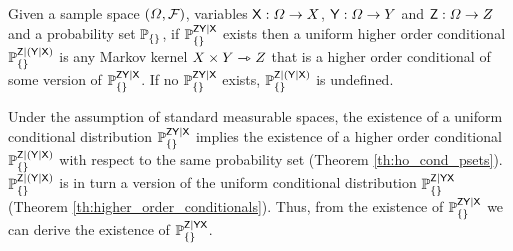 \begin{definition}\label{def:ho_cprob_pset}
Given a sample space $(\Omega,\mathcal{F})$, variables $\mathsf{X}:\Omega\to X$, $\mathsf{Y}:\Omega\to Y$ and $\mathsf{Z}:\Omega\to Z$ and a probability set $\mathbb{P}_{\{\}}$, if $\mathbb{P}_{\{\}}^{\mathsf{ZY}|\mathsf{X}}$ exists then a uniform higher order conditional $\mathbb{P}_{\{\}}^{\mathsf{Z}|(\mathsf{Y}|\mathsf{X})}$ is any Markov kernel $X\times Y\rightarrowtriangle Z$ that is a higher order conditional of some version of $\mathbb{P}_{\{\}}^{\mathsf{ZY}|\mathsf{X}}$. If no $\mathbb{P}_{\{\}}^{\mathsf{ZY}|\mathsf{X}}$ exists, $\mathbb{P}_{\{\}}^{\mathsf{Z}|(\mathsf{Y}|\mathsf{X})}$ is undefined.
\end{definition}

Under the assumption of standard measurable spaces, the existence of a uniform conditional distribution $\mathbb{P}_{\{\}}^{\mathsf{ZY}|\mathsf{X}}$ implies the existence of a higher order conditional $\mathbb{P}_{\{\}}^{\mathsf{Z}|(\mathsf{Y}|\mathsf{X})}$ with respect to the same probability set (Theorem \ref{th:ho_cond_psets}). $\mathbb{P}_{\{\}}^{\mathsf{Z}|(\mathsf{Y}|\mathsf{X})}$ is in turn a version of the uniform conditional distribution $\mathbb{P}_{\{\}}^{\mathsf{Z}|\mathsf{YX}}$ (Theorem \ref{th:higher_order_conditionals}). Thus, from the existence of $\mathbb{P}_{\{\}}^{\mathsf{ZY}|\mathsf{X}}$ we can derive the existence of $\mathbb{P}_{\{\}}^{\mathsf{Z}|\mathsf{YX}}$.



